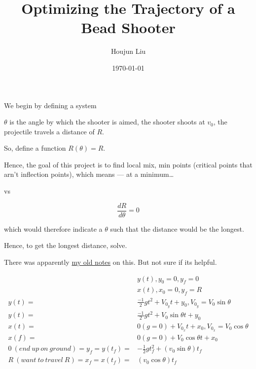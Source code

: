 \documentclass[letterpaper]{article}
\author{Houjun Liu}
\date{\today}
\title{Optimizing the Trajectory of a Bead Shooter}
\renewcommand\maketitle{}
\begin{document}
\maketitle
We begin by defining a system

\(\theta\) is the angle by which the shooter is aimed, the shooter shoots at \(v_0\), the projectile travels a distance of \(R\).

So, define a function \(R(\theta) = R\).

Hence, the goal of this project is to find local mix, min points (critical points that arn't inflection points), which means --- at a minimum\ldots{}

vs

\begin{equation}
    \frac{dR}{d\theta} = 0
\end{equation}

which would therefore indicate a \(\theta\) such that the distance would be the longest.

Hence, to get the longest distance, solve.

There was apparently \href{https://www.notion.so/shabangsystems/Projectiles-Trajectories-d9d491162e6844f9aefd2cc6dda8d334}{my old notes} on this. But not sure if its helpful.


\begin{align}
    &y(t), y_0=0, y_f=0 \\
&x(t), x_0=0, y_f=R \\
y(t) =& \frac{-1}{2} gt^2 + V_0_y t + y_0, V_0_y =  V_0 \sin\theta \\
y(t) =& \frac{-1}{2} gt^2 + V_0 \sin\theta t + y_0\\
x(t) =& 0 (g=0) + V_0_x t + x_0, V_0_x = V_0 \cos\theta  \\
x(f) =& 0 (g=0) + V_0 \cos\theta t + x_0 \\
0\ (end\ up\ on\ ground) = y_f = y(t_f) =& -\frac{1}{2}g t_f^2 + (v_0\sin\theta)t_f \\
R\ (want\ to\ travel\ R) = x_f = x(t_f) =& (v_0\cos\theta)t_f \\
\end{align}
\end{document}

